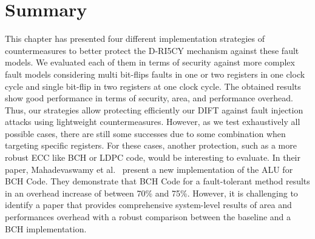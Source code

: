 \section{Summary}

This chapter has presented four different implementation strategies of countermeasures to better protect the D-RI5CY mechanism against these fault models. We evaluated each of them in terms of security against more complex fault models considering multi bit-flips faults in one or two registers in one clock cycle and single bit-flip in two registers at one clock cycle. The obtained results show good performance in terms of security, area, and performance overhead. Thus, our strategies allow protecting efficiently our DIFT against fault injection attacks using lightweight countermeasures. However, as we test exhaustively all possible cases, there are still some successes due to some combination when targeting specific registers. For these cases, another protection, such as a more robust ECC like BCH or LDPC code, would be interesting to evaluate. In their paper, Mahadevaswamy et al.~\cite{MSS-12-ijsce} present a new implementation of the ALU for BCH Code. They demonstrate that BCH Code for a fault-tolerant method results in an overhead increase of between 70\% and 75\%. However, it is challenging to identify a paper that provides comprehensive system-level results of area and performances overhead with a robust comparison between the baseline and a BCH implementation.

